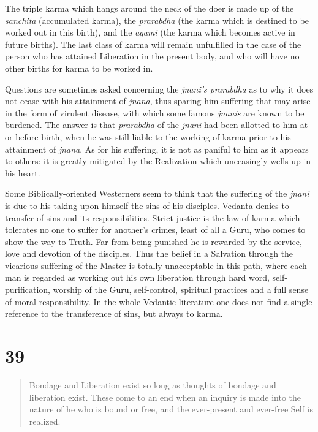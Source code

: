 \documentclass[12pt]{report}
\begin{document}
{The triple karma which hangs around the neck of the doer is made up of
the \emph{sanchita} (accumulated karma), the \emph{prarabdha} (the
karma which is destined to be worked out in this birth), and the
\emph{agami} (the karma which becomes active in future births). The
last class of karma will remain unfulfilled in the case of the person
who has attained Liberation in the present body, and who will have no
other births for karma to be worked in.

Questions are sometimes asked concerning the \emph{jnani's prarabdha}
as to why it does not cease with his attainment of \emph{jnana}, thus
sparing him suffering that may arise in the form of virulent disease,
with which some famous \emph{jnanis} are known to be burdened. The
answer is that \emph{prarabdha} of the \emph{jnani} had been allotted
to him at or before birth, when he was still liable to the working of
karma prior to his attainment of \emph{jnana}. As for his suffering,
it is not as paniful to him as it appears to others: it is greatly
mitigated by the Realization which unceasingly wells up in his heart.

Some Biblically-oriented Westerners seem to think that the suffering
of the \emph{jnani} is due to his taking upon himself the sins of his
disciples. Vedanta denies to transfer of sins and its
responsibilities. Strict justice is the law of karma which tolerates
no one to suffer for another's crimes, least of all a Guru, who comes
to show the way to Truth. Far from being punished he is rewarded by
the service, love and devotion of the disciples. Thus the belief in a
Salvation through the vicarious suffering of the Master is totally
unacceptable in this path, where each man is regarded as working out
his own liberation through hard word, self-purification, worship of
the Guru, self-control, spiritual practices and a full sense of moral
responsibility. In the whole Vedantic literature one does not find a
single reference to the transference of sins, but always to karma.


\section*{39}

\begin{quote}
  Bondage and Liberation exist so long as thoughts of bondage and
  liberation exist. These come to an end when an inquiry is made into
  the nature of he who is bound or free, and the ever-present and
  ever-free Self is realized.
\end{quote}

}
\end{document}
